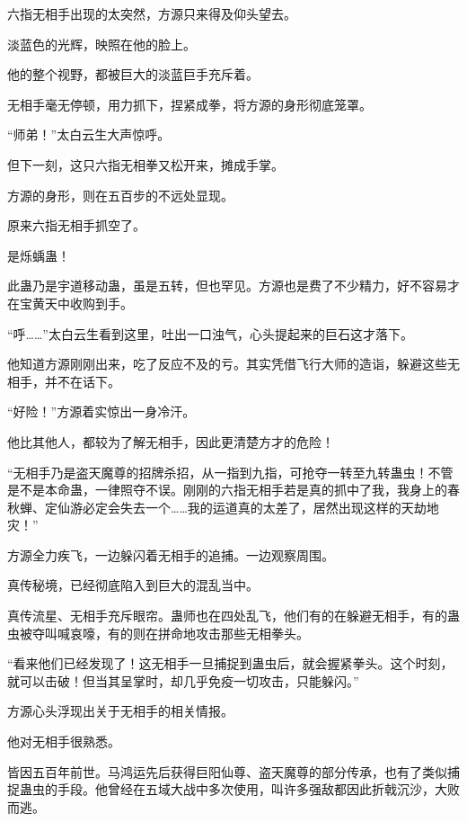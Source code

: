 
\begin{this_body}



六指无相手出现的太突然，方源只来得及仰头望去。

淡蓝色的光辉，映照在他的脸上。

他的整个视野，都被巨大的淡蓝巨手充斥着。

无相手毫无停顿，用力抓下，捏紧成拳，将方源的身形彻底笼罩。

“师弟！”太白云生大声惊呼。

但下一刻，这只六指无相拳又松开来，摊成手掌。

方源的身形，则在五百步的不远处显现。

原来六指无相手抓空了。

是烁蝺蛊！

此蛊乃是宇道移动蛊，虽是五转，但也罕见。方源也是费了不少精力，好不容易才在宝黄天中收购到手。

“呼……”太白云生看到这里，吐出一口浊气，心头提起来的巨石这才落下。

他知道方源刚刚出来，吃了反应不及的亏。其实凭借飞行大师的造诣，躲避这些无相手，并不在话下。

“好险！”方源着实惊出一身冷汗。

他比其他人，都较为了解无相手，因此更清楚方才的危险！

“无相手乃是盗天魔尊的招牌杀招，从一指到九指，可抢夺一转至九转蛊虫！不管是不是本命蛊，一律照夺不误。刚刚的六指无相手若是真的抓中了我，我身上的春秋蝉、定仙游必定会失去一个……我的运道真的太差了，居然出现这样的天劫地灾！”

方源全力疾飞，一边躲闪着无相手的追捕。一边观察周围。

真传秘境，已经彻底陷入到巨大的混乱当中。

真传流星、无相手充斥眼帘。蛊师也在四处乱飞，他们有的在躲避无相手，有的蛊虫被夺叫喊哀嚎，有的则在拼命地攻击那些无相拳头。

“看来他们已经发现了！这无相手一旦捕捉到蛊虫后，就会握紧拳头。这个时刻，就可以击破！但当其呈掌时，却几乎免疫一切攻击，只能躲闪。”

方源心头浮现出关于无相手的相关情报。

他对无相手很熟悉。

皆因五百年前世。马鸿运先后获得巨阳仙尊、盗天魔尊的部分传承，也有了类似捕捉蛊虫的手段。他曾经在五域大战中多次使用，叫许多强敌都因此折戟沉沙，大败而逃。


\end{this_body}
